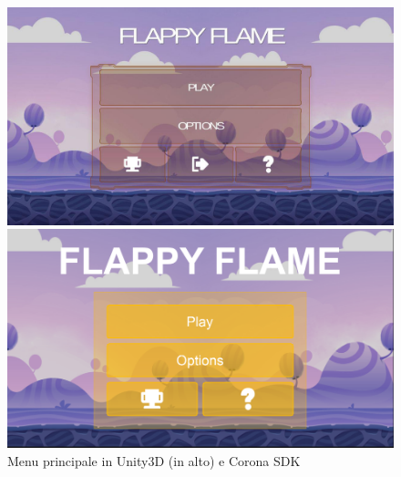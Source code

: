 	\newpage
	\begin{figure} [h!]
		\centering
		\includegraphics[width=\textwidth]{img/unityMenu}
		
		\vspace{2cm}
		
		\includegraphics[width=\textwidth]{img/coronaMenu}
		\caption{Menu principale in Unity3D (in alto) e Corona SDK}
		\label{fig:menu}
	\end{figure}
	

